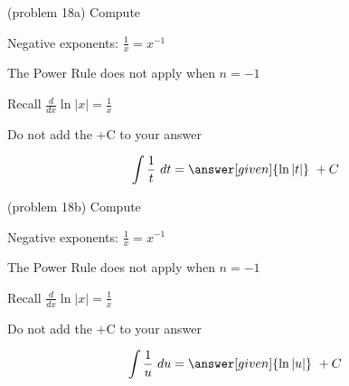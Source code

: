 \documentclass{ximera}
\begin{document}
\begin{problem}(problem 18a)
Compute 

\begin{hint}
Negative exponents: $\frac{1}{x} = x^{-1}$
\end{hint}
\begin{hint}
The Power Rule does not apply when $n = -1$
\end{hint}
\begin{hint}
Recall $\frac{d}{dx} \ln|x| = \frac{1}{x}$
\end{hint}
\begin{hint}
\begin{center}
Do not add the +C to your answer
\end{center}
\end{hint}

\[
\int \frac{1}{t} \ dt =
\answer[given]{\ln|t|} \ + C
\]
\end{problem}

\begin{problem}(problem 18b)
Compute 

\begin{hint}
Negative exponents: $\frac{1}{x} = x^{-1}$
\end{hint}
\begin{hint}
The Power Rule does not apply when $n = -1$
\end{hint}
\begin{hint}
Recall $\frac{d}{dx} \ln|x| = \frac{1}{x}$
\end{hint}
\begin{hint}
\begin{center}
Do not add the +C to your answer
\end{center}
\end{hint}

\[
\int \frac{1}{u} \ du =
\answer[given]{\ln|u|} \ + C
\]
\end{problem}
\end{document}
